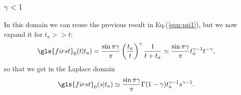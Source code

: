 \subsubsection{$\gamma<1$}
In this domain we can reuse the previous result in Eq.(\ref{eqn:psi1}), but we now expand it for $t_a>>t$:
\begin{equation}
 \gls{first}_0(t|t_a) = \frac{\sin \pi \gamma}{\pi} \left( \frac{t_a}{t}\right)^\gamma \frac{1}{t+t_a} 
  \simeq  \frac{\sin \pi \gamma}{\pi} t_a^{\gamma-1} t^{-\gamma},
\end{equation}
so that we get in the Laplace domain 
\begin{equation}
 \gls{first}_0(s|t_a) \simeq \frac{\sin \pi \gamma}{\pi} \Gamma(1-\gamma) t_a^{\gamma-1} s^{\gamma-1}.
\end{equation}


